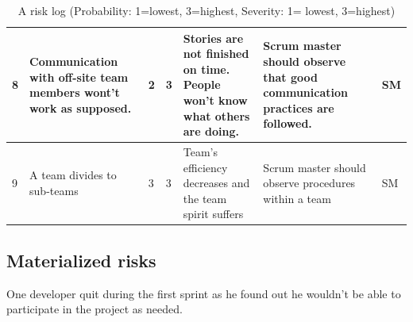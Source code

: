 \begin{table}[H]
{\begin{tabular}{|p{0.5cm}|p{3cm}|p{1cm}|p{1.5cm}|p{4cm}|p{4cm}|p{1cm}|}
8 &
Communication with off-site team members wont't work as supposed. &
2 &
3 &
Stories are not finished on time. People won't know what others are doing. &
Scrum master should observe that good communication practices are followed. &
SM 
\\
\hline

9 &
A team divides to sub-teams &
3 &
3 &
Team's efficiency decreases and the team spirit suffers &
Scrum master should observe procedures within a team &
SM
\\
\hline

\end{tabular} 
}
\caption{A risk log (Probability: 1=lowest, 3=highest, Severity: 1= lowest, 
3=highest)}
\label{table:Risklog}
\end{table}

\subsection{Materialized risks}

One developer quit during the first sprint as he found out he wouldn't be able
to participate in the project as needed.

